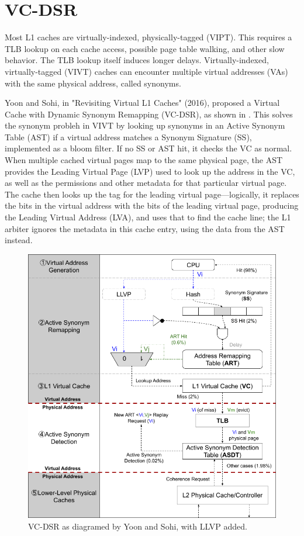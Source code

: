 \section{VC-DSR}

Most L1 caches are virtually-indexed, physically-tagged (VIPT).  This requires a TLB lookup on each cache access, possible page table walking, and other slow behavior.  The TLB lookup itself induces longer delays.  Virtually-indexed, virtually-tagged (VIVT) caches can encounter multiple virtual addresses (VAs) with the same physical address, called synonyms.

Yoon and Sohi, in "Revisiting Virtual L1 Caches" (2016), proposed a Virtual Cache with Dynamic Synonym Remapping (VC-DSR), as shown in .  This solves the synonym probleh in VIVT by looking up synonyms in an Active Synonym Table (AST) if a virtual address matches a Synonym Signature (SS), implemented as a bloom filter.  If no SS or AST hit, it checks the VC as normal.  When multiple cached virtual pages map to the same physical page, the AST provides the Leading Virtual Page (LVP) used to look up the address in the VC, as well as the permissions and other metadata for that particular virtual page.  The cache then looks up the tag for the leading virtual page—logically, it replaces the bits in the virtual address with the bits of the leading virtual page, producing the Leading Virtual Address (LVA), and uses that to find the cache line; the L1 arbiter ignores the metadata in this cache entry, using the data from the AST instead.

\begin{figure}[hbpt]
    \centering
    \includegraphics[width=\textwidth]{images/VC-DSR_Cache}
    \caption{\label{fig:VC-DSR}VC-DSR as diagramed by Yoon and Sohi, with LLVP added.}
\end{figure}

